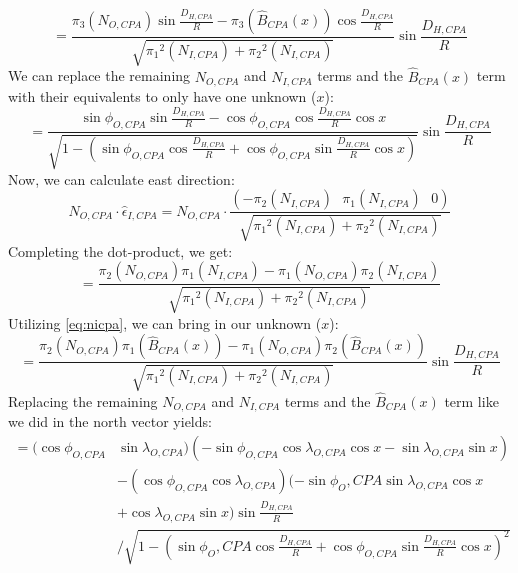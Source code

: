 \begin{equation}
    = \frac{\pi_{3}(N_{O,CPA})\sin{\frac{D_{H,CPA}}{R}}-\pi_{3}(\hat{B}_{CPA}(x))\cos{\frac{D_{H,CPA}}{R}}}{\sqrt{\pi_{1}{}^{2}(N_{I,CPA}) + \pi_{2}{}^{2}(N_{I,CPA})}}\sin{\frac{D_{H,CPA}}{R}}
\end{equation}
We can replace the remaining \(N_{O,CPA}\) and \(N_{I,CPA}\) terms and the \(\hat{B}_{CPA}(x)\) term with their equivalents to only have one unknown (\(x\)):
\begin{equation}
    = \frac{\sin{\phi_{O,CPA}}\sin{\frac{D_{H,CPA}}{R}}-\cos{\phi_{O,CPA}}\cos{\frac{D_{H,CPA}}{R}}\cos{x}}{\sqrt{1- \left(\sin{\phi_{O,CPA}}\cos{\frac{D_{H,CPA}}{R}} + \cos{\phi_{O,CPA}}\sin{\frac{D_{H,CPA}}{R}}\cos{x} \right) }}\sin{\frac{D_{H,CPA}}{R}}
\end{equation}
Now, we can calculate east direction:
\begin{equation}
    N_{O,CPA} \cdot \hat{\epsilon}_{I,CPA} = N_{O,CPA} \cdot \frac{(-\pi_{2}(N_{I,CPA}) \ \ \ \pi_{1}(N_{I,CPA}) \ \ \ 0)}{\sqrt{\pi_{1}{}^{2}(N_{I,CPA}) + \pi_{2}{}^2(N_{I,CPA})}}
\end{equation}
Completing the dot-product, we get:
\begin{equation}
    = \frac{\pi_{2}(N_{O,CPA})\pi_{1}(N_{I,CPA})-\pi_{1}(N_{O,CPA})\pi_{2}(N_{I,CPA})}{\sqrt{\pi_{1}{}^{2}(N_{I,CPA})+\pi_{2}{}^{2}(N_{I,CPA})}}
\end{equation}
Utilizing \ref{eq:nicpa}, we can bring in our unknown (\(x\)):
\begin{equation}
    =\frac{\pi_{2}(N_{O,CPA})\pi_{1}(\hat{B}_{CPA}(x))-\pi_{1}(N_{O,CPA})\pi_{2}(\hat{B}_{CPA}(x))}{\sqrt{\pi_{1}{}^{2}(N_{I,CPA})+\pi_{2}{}^{2}(N_{I,CPA})}} \sin{\frac{D_{H,CPA}}{R}}
\end{equation}
Replacing the remaining \(N_{O,CPA}\) and \(N_{I,CPA}\) terms and the \(\hat{B}_{CPA}(x)\) term like we did in the north vector yields:
\begin{equation}
    \begin{aligned}
        = (\cos{\phi_{O,CPA}}&\sin{\lambda_{O,CPA}})(-\sin{\phi_{O,CPA}}\cos{\lambda_{O,CPA}}\cos{x}-\sin{\lambda_{O,CPA}}\sin{x}) \\
        &-(\cos{\phi_{O,CPA}}\cos{\lambda_{O,CPA}})(-\sin{\phi_O,CPA}\sin{\lambda_{O,CPA}}\cos{x} \\
        &+ \cos{\lambda_{O,CPA}}\sin{x})\sin{\frac{D_{H,CPA}}{R}} \\
        & / \sqrt{1 - \left( \sin{\phi_O,CPA}\cos{\frac{D_{H,CPA}}{R}} + \cos{\phi_{O,CPA}}\sin{\frac{D_{H,CPA}}{R}}\cos{x} \right)^{2}}
    \end{aligned}
\end{equation}

